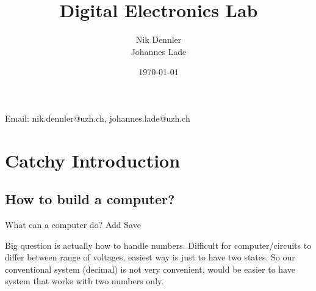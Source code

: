 \documentclass[10pt,a4paper]{article}
\author{Nik Dennler \\ Johannes Lade}
\title{Digital Electronics Lab}
\date{\today{}}
\begin{document}
	
\begin{titlepage}
	\maketitle
		\begin{center}
			Email: nik.dennler@uzh.ch, johannes.lade@uzh.ch
		\end{center}
	\thispagestyle{empty}
\end{titlepage}




\tableofcontents
\newpage

\section{Catchy Introduction}
\subsection{How to build a computer?}
What can a computer do?
Add
Save

Big question is actually how to handle numbers. Difficult for computer/circuits to differ between range of voltages, easiest way is just to have two states. So our conventional system (decimal) is not very convenient, would be easier to have system that works with two numbers only. 







\end{document}
